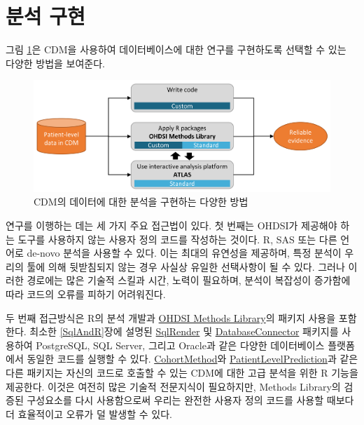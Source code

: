 \documentclass[11pt]{book}
\theoremstyle{definition}
\theoremstyle{definition}
\theoremstyle{definition}
\theoremstyle{remark}
\begin{document}
\section{분석 구현}\label{analysisImplementation}

그림 \ref{fig:implementations}은 CDM을 사용하여 데이터베이스에 대한
연구를 구현하도록 선택할 수 있는 다양한 방법을 보여준다.

\begin{figure}

{\centering \includegraphics[width=0.9\linewidth]{images/OhdsiAnalyticsTools/implementations} 

}

\caption{CDM의 데이터에 대한 분석을 구현하는 다양한 방법}\label{fig:implementations}
\end{figure}

연구를 이행하는 데는 세 가지 주요 접근법이 있다. 첫 번째는 OHDSI가
제공해야 하는 도구를 사용하지 않는 사용자 정의 코드를 작성하는 것이다.
R, SAS 또는 다른 언어로 de-novo 분석을 사용할 수 있다. 이는 최대의
유연성을 제공하며, 특정 분석이 우리의 툴에 의해 뒷받침되지 않는 경우
사실상 유일한 선택사항이 될 수 있다. 그러나 이러한 경로에는 많은 기술적
스킬과 시간, 노력이 필요하며, 분석이 복잡성이 증가함에 따라 코드의
오류를 피하기 어려워진다.

두 번째 접근방식은 R의 분석 개발과
\href{https://ohdsi.github.io/MethodsLibrary/}{OHDSI Methods Library}의
패키지 사용을 포함한다. 최소한 \ref{SqlAndR}장에 설명된
\href{https://ohdsi.github.io/SqlRender/}{SqlRender} 및
\href{https://ohdsi.github.io/DatabaseConnector/}{DatabaseConnector}
패키지를 사용하여 PostgreSQL, SQL Server, 그리고 Oracle과 같은 다양한
데이터베이스 플랫폼에서 동일한 코드를 실행할 수 있다.
\href{https://ohdsi.github.io/CohortMethod/}{CohortMethod}와
\href{https://ohdsi.github.io/PatientLevelPrediction/}{PatientLevelPrediction}과
같은 다른 패키지는 자신의 코드로 호출할 수 있는 CDM에 대한 고급 분석을
위한 R 기능을 제공한다. 이것은 여전히 많은 기술적 전문지식이 필요하지만,
Methods Library의 검증된 구성요소를 다시 사용함으로써 우리는 완전한
사용자 정의 코드를 사용할 때보다 더 효율적이고 오류가 덜 발생할 수 있다.
\end{document}
